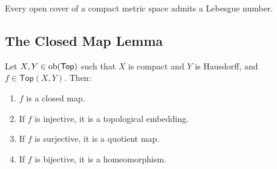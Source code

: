 \begin{lemma}
	\label{lem:Lebesgue_number_lemma}
	Every open cover of a compact metric space admits a Lebesgue number.	
\end{lemma}

\subsection*{The Closed Map Lemma}

\begin{lemma}
	Let $X,Y \in \operatorname{ob}(\mathsf{Top})$ such that $X$ is compact and $Y$ is Hausdorff, and $f \in \mathsf{Top}(X,Y)$. Then:
	\begin{enumerate}[label = \textup{(}\alph*\textup{)},wide = 0pt]
		\item $f$ is a closed map.
		\item If $f$ is injective, it is a topological embedding.
		\item If $f$ is surjective, it is a quotient map.
		\item If $f$ is bijective, it is a homeomorphism.
	\end{enumerate}
	\label{lem:closed_map_lemma}
\end{lemma}


